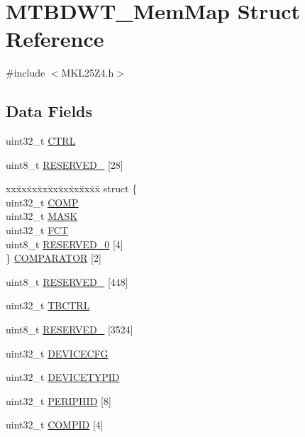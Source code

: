 \hypertarget{struct_m_t_b_d_w_t___mem_map}{}\section{M\+T\+B\+D\+W\+T\+\_\+\+Mem\+Map Struct Reference}
\label{struct_m_t_b_d_w_t___mem_map}


{\ttfamily \#include $<$M\+K\+L25\+Z4.\+h$>$}

\subsection*{Data Fields}
\begin{DoxyCompactItemize}
\item 
uint32\+\_\+t \hyperlink{struct_m_t_b_d_w_t___mem_map_aba0d8163fee473f1b1a2a8528f49639c}{C\+T\+RL}
\item 
uint8\+\_\+t \hyperlink{struct_m_t_b_d_w_t___mem_map_a4e0b43e26991088f981cfcc4d3548c01}{R\+E\+S\+E\+R\+V\+E\+D\+\_} \mbox{[}28\mbox{]}
\item 
\begin{tabbing}
xx\=xx\=xx\=xx\=xx\=xx\=xx\=xx\=xx\=\kill
struct \{\\
\>uint32\_t \hyperlink{struct_m_t_b_d_w_t___mem_map_a2dc253306d19e9f365e7ac79eecb8f07}{COMP}\\
\>uint32\_t \hyperlink{struct_m_t_b_d_w_t___mem_map_aaef890e895e809c3197697b5f53eaf43}{MASK}\\
\>uint32\_t \hyperlink{struct_m_t_b_d_w_t___mem_map_a245357bec738a4b4efe972976710ee58}{FCT}\\
\>uint8\_t \hyperlink{struct_m_t_b_d_w_t___mem_map_a4e0b43e26991088f981cfcc4d3548c01}{RESERVED\_0} \mbox{[}4\mbox{]}\\
\} \hyperlink{struct_m_t_b_d_w_t___mem_map_adba23d153aeddebbab1e08585bed8c54}{COMPARATOR} \mbox{[}2\mbox{]}\\

\end{tabbing}\item 
uint8\+\_\+t \hyperlink{struct_m_t_b_d_w_t___mem_map_aafe008f8a3ddd6bb4b58dc3309fad883}{R\+E\+S\+E\+R\+V\+E\+D\+\_} \mbox{[}448\mbox{]}
\item 
uint32\+\_\+t \hyperlink{struct_m_t_b_d_w_t___mem_map_a2d08a9ac507db96efebd284e02f0efe9}{T\+B\+C\+T\+RL}
\item 
uint8\+\_\+t \hyperlink{struct_m_t_b_d_w_t___mem_map_a87be1a8207dafcd8e23d78b12b05fb64}{R\+E\+S\+E\+R\+V\+E\+D\+\_} \mbox{[}3524\mbox{]}
\item 
uint32\+\_\+t \hyperlink{struct_m_t_b_d_w_t___mem_map_a836782ca35496627b905b98747e750c9}{D\+E\+V\+I\+C\+E\+C\+FG}
\item 
uint32\+\_\+t \hyperlink{struct_m_t_b_d_w_t___mem_map_a86a983ab8675b605e5769d98195ed8fd}{D\+E\+V\+I\+C\+E\+T\+Y\+P\+ID}
\item 
uint32\+\_\+t \hyperlink{struct_m_t_b_d_w_t___mem_map_a59a2401dc9511e3c87fcc5c2a9867f49}{P\+E\+R\+I\+P\+H\+ID} \mbox{[}8\mbox{]}
\item 
uint32\+\_\+t \hyperlink{struct_m_t_b_d_w_t___mem_map_a4a32a81244f65ec304572767d33fcbce}{C\+O\+M\+P\+ID} \mbox{[}4\mbox{]}
\end{DoxyCompactItemize}



